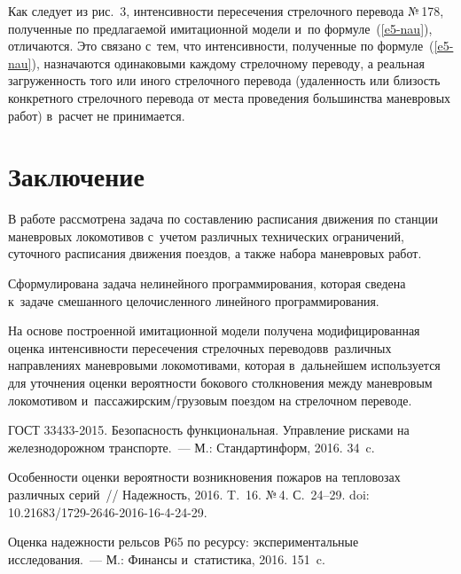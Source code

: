 \begin{multicols}{2}
  Как следует из рис.~3, интенсивности пересечения стрелочного перевода 
№\,178, полученные по предлагаемой имитационной модели и~по 
формуле~(\ref{e5-nau}), отличаются. Это связано с~тем, что интенсивности, 
полученные по формуле~(\ref{e5-nau}), назначаются одинаковыми каждому 
стрелочному переводу, а реальная загруженность того или иного стрелочного 
перевода (удаленность или близость конкретного стрелочного перевода от места 
проведения большинства маневровых работ) в~расчет не принимается.

\section{Заключение}
\vspace*{-2pt}

 В работе рассмотрена задача по составлению расписания движения по 
станции маневровых локомотивов с~учетом различных технических ограничений, 
суточного расписания движения поездов, а также набора маневровых работ. 

Сформулирована задача нелинейного программирования, которая сведена к~задаче 
смешанного целочисленного линейного программирования. 

На основе 
построенной имитационной модели получена модифицированная оценка 
интен\-сивности пересечения стрелочных переводов\linebreak в~различных направлениях 
маневровыми локомотивами, которая в~дальнейшем используется для уточнения 
оценки вероятности бокового столкновения между маневровым локомотивом 
и~пассажирским/грузовым поездом на стрелочном пере\-воде.

\vspace*{-8pt}
      
{\small\frenchspacing
 {%
 \begin{thebibliography}{99}
\vspace*{-2pt}

ГОСТ 33433-2015. Безопасность функциональная. Управление рисками на железнодорожном 
транспорте.~--- М.: Стандартинформ, 2016. 34~c.

 Особенности оценки 
вероятности возникновения пожаров на тепловозах различных серий~// 
Надежность, 2016. T.~16. №\,4. С.~24--29. 
doi: 10.21683/1729-2646-2016-16-4-24-29.

 Оценка надежности рельсов Р65 по ресурсу: экспериментальные 
исследования.~--- М.: Финансы и~статистика, 2016. 151~c.


\end{thebibliography}}}
\end{multicols}
